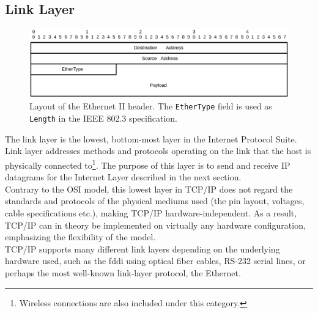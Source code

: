 \subsection{Link Layer}
\begin{figure}
\centering
\includegraphics[width=\linewidth]{background/ethernet.eps}
\caption{Layout of the Ethernet II header. The \texttt{EtherType} field is used
as \texttt{Length} in the IEEE 802.3 specification.}
\label{fig:ethernet_header}
\end{figure}


The link layer is the lowest, bottom-most layer in the Internet Protocol Suite.
Link layer addresses methods and protocols operating on the link that the host
is physically connected to\footnote{Wireless connections are also included
under this category.}. The purpose of this layer is to send and receive IP
datagrams for the Internet Layer described in the next section.\\
Contrary to the OSI model, this lowest layer in TCP/IP
does not regard the standards and protocols of the physical mediums used
(the pin layout, voltages, cable specifications etc.), making TCP/IP
hardware-independent. As a result, TCP/IP can in theory be implemented on
virtually any hardware configuration, emphasizing the flexibility of the
model.\\
TCP/IP supports many different link layers depending on the underlying hardware
used, such as the \gls{fddi} using optical fiber cables\cite{RFC1103}, RS-232
serial lines\cite{tia_232}, or perhaps the most well-known link-layer protocol,
the Ethernet.

